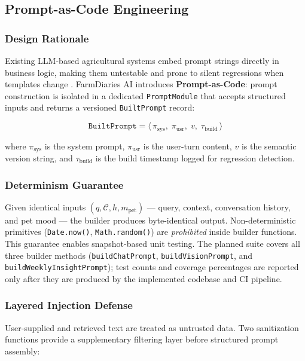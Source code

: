 \documentclass[conference]{IEEEtran}
\begin{document}
\subsection{Prompt-as-Code Engineering}

\subsubsection{Design Rationale}

Existing LLM-based agricultural systems embed prompt strings
directly in business logic, making them untestable and prone to
silent regressions when templates change \cite{pinto2023}. FarmDiaries
AI introduces \textbf{Prompt-as-Code}: prompt construction is
isolated in a dedicated \texttt{PromptModule} that accepts structured
inputs and returns a versioned \texttt{BuiltPrompt} record:

\begin{equation}
  \texttt{BuiltPrompt} = \langle\,
    \pi_{\mathrm{sys}},\;\pi_{\mathrm{usr}},\;
    v,\;\tau_{\mathrm{build}}
  \,\rangle
\end{equation}

\noindent where $\pi_{\mathrm{sys}}$ is the system prompt,
$\pi_{\mathrm{usr}}$ is the user-turn content, $v$ is the semantic
version string, and $\tau_{\mathrm{build}}$ is the build timestamp
logged for regression detection.

\subsubsection{Determinism Guarantee}

Given identical inputs
$(q, \mathcal{C}, h, m_{\mathrm{pet}})$ --- query, context,
conversation history, and pet mood --- the builder produces
byte-identical output. Non-deterministic primitives
(\texttt{Date.now()}, \texttt{Math.random()}) are
\emph{prohibited} inside builder functions. This guarantee enables
snapshot-based unit testing. The planned suite covers all three builder methods (\texttt{buildChatPrompt}, \texttt{buildVisionPrompt}, and \texttt{buildWeeklyInsightPrompt}); test counts and coverage percentages are reported only after they are produced by the implemented codebase and CI pipeline.

\subsubsection{Layered Injection Defense}

User-supplied and retrieved text are treated as untrusted data. Two sanitization functions provide a supplementary filtering layer before structured prompt assembly:
\end{document}
